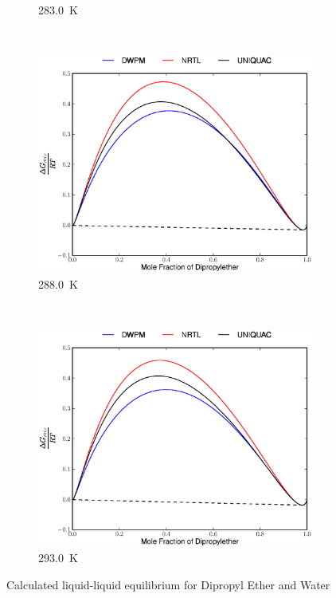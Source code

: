 \begin{figure}[hp]
\begin{subfigure}[h]{0.5\textwidth}
	\caption{283.0~$\mathrm{K}$} 
\end{subfigure}%
\\%
\begin{subfigure}[h]{0.5\textwidth}
	\centering
	\includegraphics[width = \textwidth]{Results_Parts/BinaryParams/dipropylether-water/AllModelsGibbsPlots/T_288.eps}
	\caption{288.0~$\mathrm{K}$} 
\end{subfigure}%
~%
\begin{subfigure}[h]{0.5\textwidth}
	\centering
	\includegraphics[width = \textwidth]{Results_Parts/BinaryParams/dipropylether-water/AllModelsGibbsPlots/T_293.eps}
	\caption{293.0~$\mathrm{K}$} 
\end{subfigure}%
\caption{Calculated liquid-liquid equilibrium for Dipropyl Ether and Water}
\end{figure}
